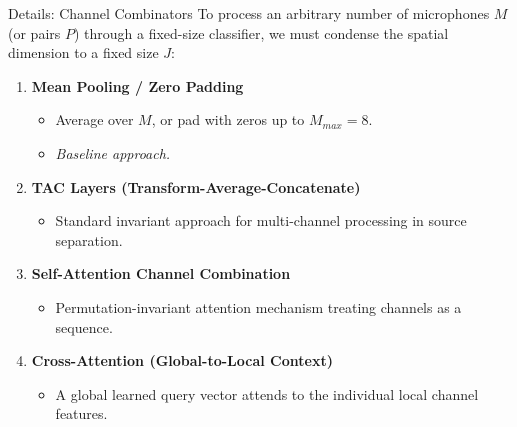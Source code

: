 \documentclass[8pt,hyperref={pdfpagelabels=true},xcolor=table,aspectratio=169]{beamer}
\begin{document}
\begin{frame}{Details: Channel Combinators}
    To process an arbitrary number of microphones $M$ (or pairs $P$) through a fixed-size classifier, we must condense the spatial dimension to a fixed size $J$:
    \vspace{0.5em}
    \begin{enumerate}
        \item \textbf{Mean Pooling / Zero Padding}
              \begin{itemize}
                  \item Average over $M$, or pad with zeros up to $M_{max} = 8$.
                  \item \textit{Baseline approach.}
              \end{itemize}
        \item \textbf{TAC Layers (Transform-Average-Concatenate)}
              \begin{itemize}
                  \item Standard invariant approach for multi-channel processing in source separation.
              \end{itemize}
        \item \textbf{Self-Attention Channel Combination}
              \begin{itemize}
                  \item Permutation-invariant attention mechanism treating channels as a sequence.
              \end{itemize}
        \item \textbf{Cross-Attention (Global-to-Local Context)}
              \begin{itemize}
                  \item A global learned query vector attends to the individual local channel features.
              \end{itemize}
    \end{enumerate}
\end{frame}
\end{document}

